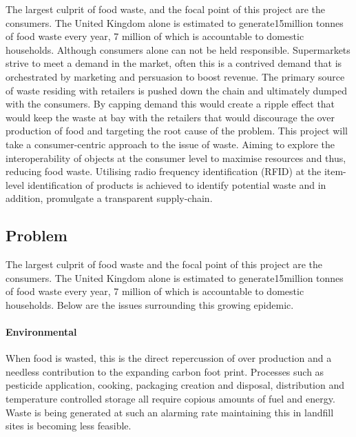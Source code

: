 \documentclass[a4paper, 11pt]{article}
\begin{document}
\vspace{\baselineskip}

The largest culprit of food waste, and the focal point of this project are the consumers. The United Kingdom alone is estimated to generate15million tonnes of food waste every year, 7 million of which is accountable to domestic households. Although consumers alone can not be held responsible. Supermarkets strive to meet a demand in the market, often this is a contrived demand that is orchestrated by marketing and persuasion to boost revenue. The primary source of waste residing with retailers is pushed down the chain and ultimately dumped with the consumers. By capping demand this would create a ripple effect that would keep the waste at bay with the retailers that would discourage the over production of food and targeting the root cause of the problem.
This project will take a consumer-centric approach to the issue of waste. Aiming to explore the interoperability of objects at the consumer level to maximise resources and thus, reducing food waste. Utilising radio frequency identification (RFID) at the item-level identification of products is achieved to identify potential waste and in addition, promulgate a transparent supply-chain.

\vspace{\baselineskip}
\vspace{\baselineskip}
\vspace{\baselineskip}

\subsection{Problem}
The largest culprit of food waste and the focal point of this project are the consumers. The United Kingdom alone is estimated to generate15million tonnes of food waste every year, 7 million of which is accountable to domestic households. Below are the issues surrounding this growing epidemic. 

\paragraph{Environmental}When food is wasted, this is the direct repercussion of over production and a needless contribution to the expanding carbon foot print. Processes such as pesticide application, cooking, packaging creation and disposal, distribution and temperature controlled storage all require copious amounts of fuel and energy. Waste is being generated at such an alarming rate maintaining this in landfill sites is becoming less feasible.
\end{document}
